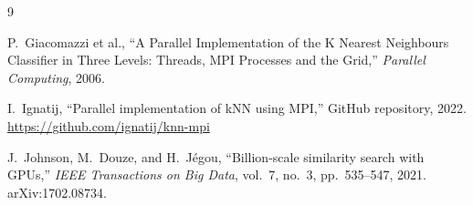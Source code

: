 \documentclass[12pt,a4paper]{article}
\begin{document}
\begin{thebibliography}{9}

  P.~Giacomazzi et al.,
  ``A Parallel Implementation of the K Nearest Neighbours Classifier
    in Three Levels: Threads, MPI Processes and the Grid,''
  \textit{Parallel Computing}, 2006.

  I.~Ignatij,
  ``Parallel implementation of kNN using MPI,''
  GitHub repository, 2022.
  \url{https://github.com/ignatij/knn-mpi}

  J.~Johnson, M.~Douze, and H.~Jégou,
  ``Billion-scale similarity search with GPUs,''
  \textit{IEEE Transactions on Big Data}, vol.~7, no.~3, pp.~535--547, 2021.
  arXiv:1702.08734.

\end{thebibliography}
\end{document}
